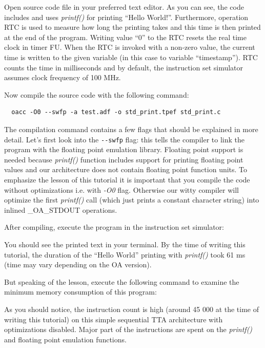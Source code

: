 \documentclass[a4paper,twoside]{tceusermanual}
\begin{document}
Open source code file  in your preferred text
editor. As you can see, the code includes  and uses
\textit{printf()} for printing ``Hello World!''. Furthermore,
operation RTC is used to measure how long the printing takes and this
time is then printed at the end of the program. Writing value ``0'' to
the RTC resets the real time clock in timer FU. When the RTC is
invoked with a non-zero value, the current time is written to the
given variable (in this case to variable ``timestamp''). RTC counts
the time in milliseconds and by default, the instruction set simulator
assumes clock frequency of 100 MHz.

Now compile the source code with the following command:

\begin{verbatim}
  oacc -O0 --swfp -a test.adf -o std_print.tpef std_print.c
\end{verbatim}

The compilation command contains a few flags that should be explained
in more detail. Let's first look into the \verb|--swfp| flag: this
tells the compiler to link the program with the floating point
emulation library. Floating point support is needed because
\textit{printf()} function includes support for printing floating
point values and our architecture does not contain floating point
function units. To emphasize the lesson of this tutorial it is
important that you compile the code without optimizations i.e. with
\textit{-O0} flag. Otherwise our witty compiler will optimize the
first \textit{printf()} call (which just prints a constant character
string) into inlined \_OA\_STDOUT operations.

After compiling, execute the program in the instruction set simulator:


You should see the printed text in your terminal. By the time of
writing this tutorial, the duration of the ``Hello World'' printing
with \textit{printf()} took 61 ms (time may vary depending on the OA
version).

But speaking of the lesson, execute the following command to examine
the minimum memory consumption of this program:


As you should notice, the instruction count is high (around 45 000 at
the time of writing this tutorial) on this simple sequential TTA
architecture with optimizations disabled. Major part of the
instructions are spent on the \textit{printf()} and floating point
emulation functions.
\end{document}
